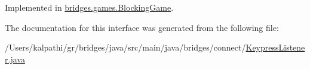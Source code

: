 Implemented in \mbox{\hyperlink{classbridges_1_1games_1_1_blocking_game_a53b1b38826785ee7c7a13f486b7b72ba}{bridges.\+games.\+Blocking\+Game}}.



The documentation for this interface was generated from the following file\+:\begin{DoxyCompactItemize}
\item 
/\+Users/kalpathi/gr/bridges/java/src/main/java/bridges/connect/\mbox{\hyperlink{_keypress_listener_8java}{Keypress\+Listener.\+java}}\end{DoxyCompactItemize}
